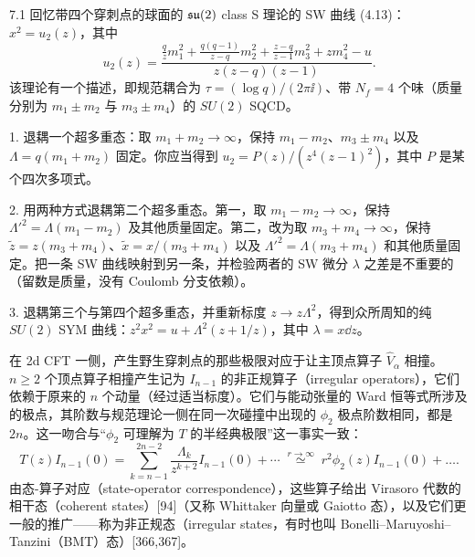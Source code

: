 \begin{exercise}{7.1}
回忆带四个穿刺点的球面的 $\mathfrak{su}(2)$ class S 理论的 SW 曲线 (4.13)：$x^2=u_2(z)$，其中
\begin{equation}
    u_2(z)=\frac{\frac{q}{z}m_1^2+\frac{q(q-1)}{z-q}m_2^2+\frac{z-q}{z-1}m_3^2+zm_4^2-u}{z(z-q)(z-1)}.
    \tag{7.20}
\end{equation}
该理论有一个描述，即规范耦合为 $\tau=(\log q)/(2\pi\ii)$、带 $N_f=4$ 个味（质量分别为 $m_1\pm m_2$ 与 $m_3\pm m_4$）的 $SU(2)$ SQCD。

1. 退耦一个超多重态：取 $m_1+m_2\to\infty$，保持 $m_1-m_2$、$m_3\pm m_4$ 以及 $\Lambda=q(m_1+m_2)$ 固定。你应当得到 $u_2=P(z)/(z^4(z-1)^2)$，其中 $P$ 是某个四次多项式。

2. 用两种方式退耦第二个超多重态。第一，取 $m_1-m_2\to\infty$，保持 $\Lambda'^2=\Lambda(m_1-m_2)$ 及其他质量固定。第二，改为取 $m_3+m_4\to\infty$，保持 $\tilde z=z(m_3+m_4)$、$\tilde x=x/(m_3+m_4)$ 以及 $\Lambda'^2=\Lambda(m_3+m_4)$ 和其他质量固定。把一条 SW 曲线映射到另一条，并检验两者的 SW 微分 $\lambda$ 之差是不重要的（留数是质量，没有 Coulomb 分支依赖）。

3. 退耦第三个与第四个超多重态，并重新标度 $z\to z\Lambda^2$，得到众所周知的纯 $SU(2)$ SYM 曲线：$z^2x^2=u+\Lambda^2(z+1/z)$，其中 $\lambda=x\dd z$。
\end{exercise}

 在 2d CFT 一侧，产生野生穿刺点的那些极限对应于让主顶点算子 $\hat V_\alpha$ 相撞。$n\ge2$ 个顶点算子相撞产生记为 $I_{n-1}$ 的非正规算子（irregular operators），它们依赖于原来的 $n$ 个动量（经过适当标度）。它们与能动张量的 Ward 恒等式所涉及的极点，其阶数与规范理论一侧在同一次碰撞中出现的 $\phi_2$ 极点阶数相同，都是 $2n$。这一吻合与“$\phi_2$ 可理解为 $T$ 的半经典极限”这一事实一致：
\begin{equation}
    T(z)I_{n-1}(0)=\sum_{k=n-1}^{2n-2}\frac{\Lambda_k}{z^{k+2}}I_{n-1}(0)+\cdots
    \;\stackrel{r\to\infty}{\simeq}\;
    r^2\phi_2(z)I_{n-1}(0)+\ldots.
    \tag{7.21}
\end{equation}
由态-算子对应（state-operator correspondence），这些算子给出 Virasoro 代数的相干态（coherent states）[94]（又称 Whittaker 向量或 Gaiotto 态），以及它们更一般的推广------称为非正规态（irregular states，有时也叫 Bonelli--Maruyoshi--Tanzini（BMT）态）[366,367]。

